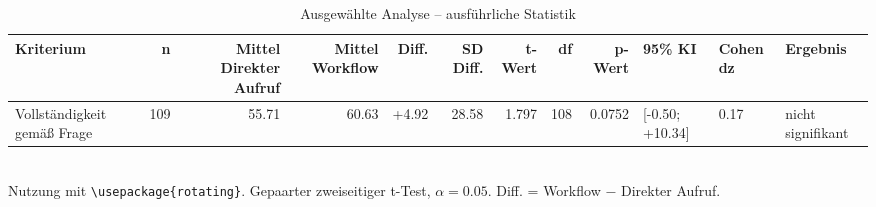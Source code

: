 \begin{table}
\centering
\caption{Ausgewählte Analyse -- ausführliche Statistik}
\begin{tabular}{lrrrrrrrrlll}
\toprule
Kriterium & n & Mittel Direkter Aufruf & Mittel Workflow & Diff. & SD Diff. & t-Wert & df & p-Wert & 95\% KI & Cohen dz & Ergebnis \\
\midrule
Vollständigkeit gemäß Frage & 109 & 55.71 & 60.63 & +4.92 & 28.58 & 1.797 & 108 & 0.0752 & [-0.50; +10.34] & 0.17 & nicht signifikant \\
\bottomrule
\end{tabular}
\\[2mm]
\footnotesize Nutzung mit \texttt{\textbackslash usepackage\{rotating\}}. Gepaarter zweiseitiger t-Test, $\alpha=0.05$. Diff. = Workflow $-$ Direkter Aufruf.
\end{table}
